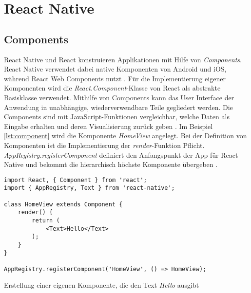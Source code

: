 \section{React Native}

\subsection{Components} \label{component}
React Native und React konstruieren Applikationen mit Hilfe von \textit{Components}. React Native verwendet dabei native Komponenten von Android und iOS, während React Web Components nutzt  \cite{facebook_inc._getting_2017}. Für die Implementierung eigener Komponenten wird die \textit{React.Component}-Klasse von React als abstrakte Basisklasse verwendet. Mithilfe von Components kann das User Interface der Anwendung in unabhängige, wiederverwendbare Teile gegliedert werden. Die Components sind mit JavaScript-Funktionen vergleichbar, welche Daten als Eingabe erhalten und deren Visualisierung zurück geben \cite{facebook_inc._components_2017}. Im Beispiel \ref{lst:component} wird die Komponente \textit{HomeView} angelegt. Bei der Definition von Komponenten ist die Implementierung der \textit{render}-Funktion Pflicht. \textit{AppRegistry.registerComponent} definiert den Anfangspunkt der App für React Native und bekommt die hierarchisch höchste Komponente übergeben \cite{facebook_inc._getting_2017}. 

\begin{listing}[H]
    \begin{verbatim}
import React, { Component } from 'react';
import { AppRegistry, Text } from 'react-native';

class HomeView extends Component {
    render() {
        return (
            <Text>Hello</Text>
        );
    }
}

AppRegistry.registerComponent('HomeView', () => HomeView);
    \end{verbatim}
    \caption{Erstellung einer eigenen Komponente, die den Text \textit{Hello} ausgibt}
    \label{lst:component}
\end{listing}

